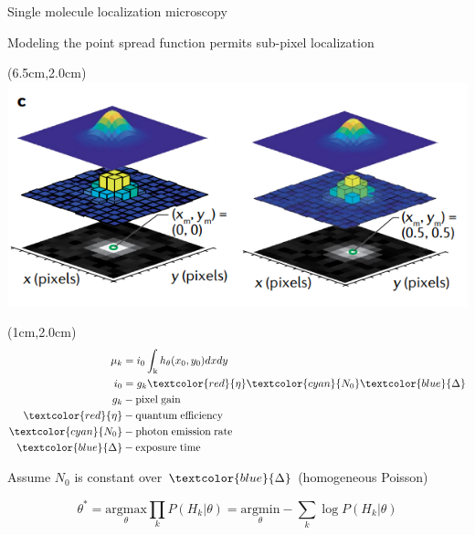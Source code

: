 \documentclass{beamer}					%
\begin{document}
\begin{frame}{Single molecule localization microscopy}

Modeling the point spread function permits sub-pixel localization 

\begin{textblock*}{8cm}(6.5cm,2.0cm)
\includegraphics[width=\textwidth]{Model.png}
\end{textblock*}

\begin{textblock*}{2cm}(1cm,2.0cm)
\begin{align*}
\mu_{k} &= i_{0}\int_{\mathrm{k}}h_{\theta}(x_{0},y_{0})dxdy\\
i_{0} &= g_{k}\textcolor{red}{\eta} \textcolor{cyan}{N_{0}}\textcolor{blue}{\Delta} 
\\
g_{k} &- \mathrm{pixel\; gain}\\
\textcolor{red}{\eta} &- \mathrm{quantum\; efficiency}\\
\textcolor{cyan}{N_{0}} &- \mathrm{photon\; emission\; rate}\\
\textcolor{blue}{\Delta} &- \mathrm{exposure\; time}
\end{align*}
\end{textblock*}

\vspace{2in}

Assume $N_{0}$ is constant over $\textcolor{blue}{\Delta}$ (homogeneous Poisson)

\begin{equation*}
\theta^{*} = \underset{\theta}{\mathrm{argmax}}\prod_{k}P(H_{k}|\theta)= \underset{\theta}{\mathrm{argmin}}-\sum_{k}\log P(H_{k}|\theta)
\end{equation*}

\end{frame}
\end{document}
